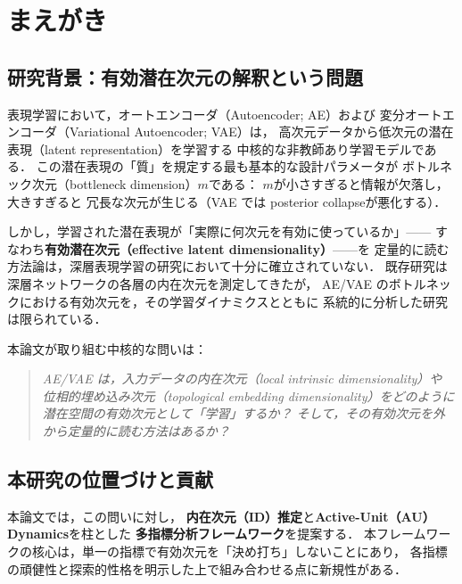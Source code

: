 \documentclass[11pt,a4paper]{jsarticle}
\begin{document}
\begin{abstract}
本論文の方法論的貢献は，「各指標が何に対して頑健で，何に対して探索的か」を
実証的かつ理論的に明確化した点にあり，AE/VAE の設計・診断のための
実用的な多指標解釈ガイドラインを確立する．
\end{abstract}

\section{まえがき}\label{sec:intro}

\subsection{研究背景：有効潜在次元の解釈という問題}\label{sec:intro_bg}

表現学習において，オートエンコーダ（Autoencoder; AE）および
変分オートエンコーダ（Variational Autoencoder; VAE）\cite{kingma2014vae}は，
高次元データから低次元の潜在表現（latent representation）を学習する
中核的な非教師あり学習モデルである\cite{bengio2013representation}．
この潜在表現の「質」を規定する最も基本的な設計パラメータが
ボトルネック次元（bottleneck dimension）$m$である：
$m$が小さすぎると情報が欠落し，大きすぎると
冗長な次元が生じる（VAE では posterior collapse\cite{lucas2019elbo}が悪化する）．

しかし，学習された潜在表現が「実際に何次元を有効に使っているか」——
すなわち\textbf{有効潜在次元（effective latent dimensionality）}——を
定量的に読む方法論は，深層表現学習の研究において十分に確立されていない．
既存研究\cite{ansuini2019intrinsic,valeriani2023geometry}は
深層ネットワークの各層の内在次元を測定してきたが，
AE/VAE のボトルネックにおける有効次元を，その学習ダイナミクスとともに
系統的に分析した研究は限られている．

本論文が取り組む中核的な問いは：
\begin{quote}
\textit{AE/VAE は，入力データの内在次元（local intrinsic dimensionality）や
位相的埋め込み次元（topological embedding dimensionality）をどのように
潜在空間の有効次元として「学習」するか？
そして，その有効次元を外から定量的に読む方法はあるか？}
\end{quote}

\subsection{本研究の位置づけと貢献}\label{sec:intro_aim}

本論文では，この問いに対し，
\textbf{内在次元（ID）推定}と\textbf{Active-Unit（AU）Dynamics}を柱とした
\textbf{多指標分析フレームワーク}を提案する．
本フレームワークの核心は，単一の指標で有効次元を「決め打ち」しないことにあり，
各指標の頑健性と探索的性格を明示した上で組み合わせる点に新規性がある．
\end{document}
